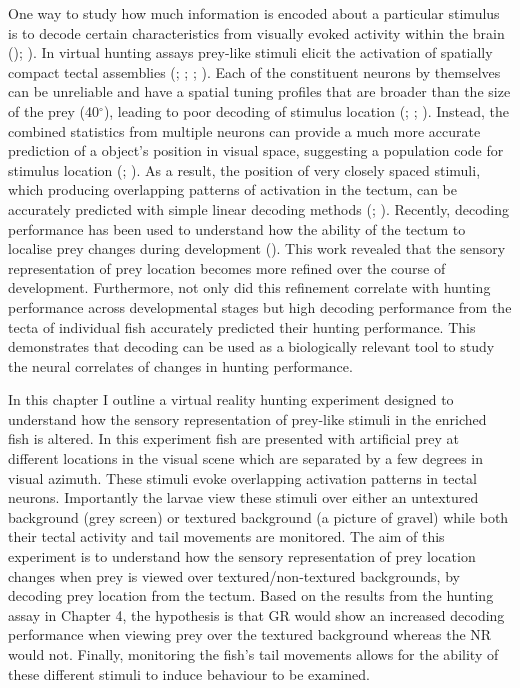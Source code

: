 One way to study how much information is encoded about a particular stimulus is to decode certain characteristics from visually evoked activity within the brain (\cite{Glaser2017MachineDecoding}); \cite{Quaglio2017}). In virtual hunting assays prey-like stimuli elicit the activation of spatially compact tectal assemblies (\cite{Bianco2015}; \cite{Romano2015}; \cite{Avitan2016}; \cite{Avitan2019}). Each of the constituent neurons by themselves can be unreliable and have a spatial tuning profiles that are broader than the size of the prey (40$^{\circ}$), leading to poor decoding of stimulus location (\cite{Niell2005FunctionalTectum}; \cite{Romano2015}; \cite{Avitan2016}). Instead, the combined statistics from multiple neurons can provide a much more accurate prediction of a object's position in visual space,  suggesting a population code for stimulus location (\cite{Averbeck2006NeuralComputation}; \cite{Avitan2019}). As a result, the position of very closely spaced stimuli, which producing overlapping patterns of activation in the tectum, can be accurately predicted with simple linear decoding methods (\cite{Avitan2016}; \cite{Avitan2019}). Recently, decoding performance has been used to understand how the ability of the tectum to localise prey changes during development (\cite{Avitan2019}). This work revealed that the sensory representation of prey location becomes more refined over the course of development. Furthermore, not only did this refinement correlate with hunting performance across developmental stages but high decoding performance from the tecta of individual fish accurately predicted their hunting performance. This demonstrates that decoding can be used as a biologically relevant tool to study the neural correlates of changes in hunting performance.

In this chapter I outline a virtual reality hunting experiment designed to understand how the sensory representation of prey-like stimuli in the enriched fish is altered. In this experiment fish are presented with artificial prey at different locations in the visual scene which are separated by a few degrees in visual azimuth. These stimuli evoke overlapping activation patterns in tectal neurons. Importantly the larvae view these stimuli over either an untextured background (grey screen) or textured background (a picture of gravel) while both their tectal activity and tail movements are monitored. The aim of this experiment is to understand how the sensory representation of prey location changes when prey is viewed over textured/non-textured backgrounds, by decoding prey location from the tectum. Based on the results from the hunting assay in Chapter 4, the hypothesis is that GR would show an increased decoding performance when viewing  prey over the textured background whereas the NR would not. Finally, monitoring the fish's tail movements allows for the ability of these different stimuli to induce behaviour to be examined.




